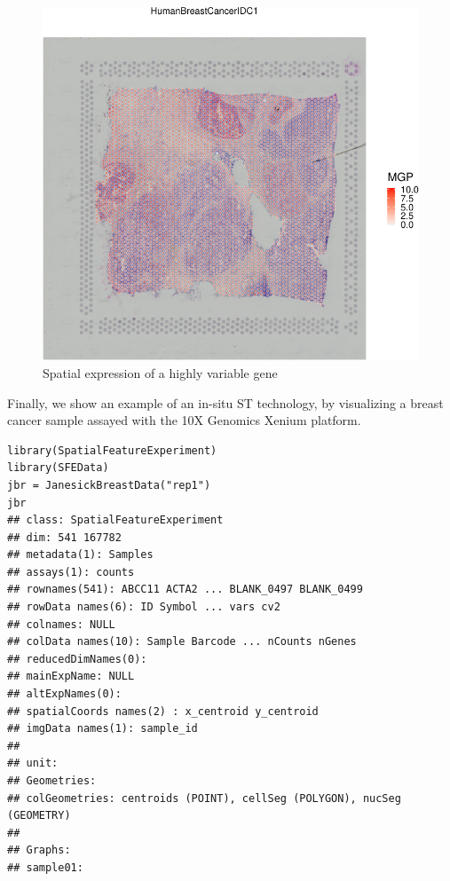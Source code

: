 \begin{figure}
\includegraphics[width=1\linewidth,]{spatpdfs/plotvisium-1} \caption{Spatial expression of a highly variable gene}\label{fig:plotvisium}
\end{figure}

Finally, we show an example of an in-situ ST technology, by visualizing a breast
cancer sample assayed with the 10X Genomics Xenium platform.

\begin{shaded}
\begin{verbatim}
library(SpatialFeatureExperiment)
library(SFEData)
jbr = JanesickBreastData("rep1")
jbr
## class: SpatialFeatureExperiment
## dim: 541 167782
## metadata(1): Samples
## assays(1): counts
## rownames(541): ABCC11 ACTA2 ... BLANK_0497 BLANK_0499
## rowData names(6): ID Symbol ... vars cv2
## colnames: NULL
## colData names(10): Sample Barcode ... nCounts nGenes
## reducedDimNames(0):
## mainExpName: NULL
## altExpNames(0):
## spatialCoords names(2) : x_centroid y_centroid
## imgData names(1): sample_id
##
## unit:
## Geometries:
## colGeometries: centroids (POINT), cellSeg (POLYGON), nucSeg (GEOMETRY)
##
## Graphs:
## sample01:
\end{verbatim}
\end{shaded}

